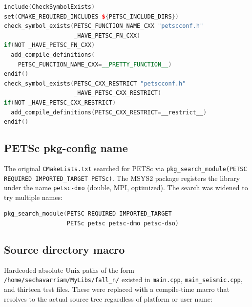 \begin{lstlisting}[language=C++, basicstyle=\ttfamily\small,
    keywordstyle=\bfseries\color{blue!70!black},
    commentstyle=\itshape\color{green!50!black},
    stringstyle=\color{red!60!black},
    frame=single, framerule=0.4pt, rulecolor=\color{gray!50},
    breaklines=true, showstringspaces=false]
include(CheckSymbolExists)
set(CMAKE_REQUIRED_INCLUDES ${PETSC_INCLUDE_DIRS})
check_symbol_exists(PETSC_FUNCTION_NAME_CXX "petscconf.h"
                    _HAVE_PETSC_FN_CXX)
if(NOT _HAVE_PETSC_FN_CXX)
  add_compile_definitions(
    PETSC_FUNCTION_NAME_CXX=__PRETTY_FUNCTION__)
endif()
check_symbol_exists(PETSC_CXX_RESTRICT "petscconf.h"
                    _HAVE_PETSC_CXX_RESTRICT)
if(NOT _HAVE_PETSC_CXX_RESTRICT)
  add_compile_definitions(PETSC_CXX_RESTRICT=__restrict__)
endif()
\end{lstlisting}

\subsection{PETSc pkg-config name}

The original \texttt{CMakeLists.txt} searched for PETSc via
\texttt{pkg\_search\_module(PETSC REQUIRED IMPORTED\_TARGET PETSc)}.  The
MSYS2 package registers the library under the name \texttt{petsc-dmo} (double,
MPI, optimized).  The search was widened to try multiple names:

\begin{lstlisting}[language=C++, basicstyle=\ttfamily\small,
    frame=single, framerule=0.4pt, rulecolor=\color{gray!50},
    breaklines=true, showstringspaces=false]
pkg_search_module(PETSC REQUIRED IMPORTED_TARGET
                  PETSc petsc petsc-dmo petsc-dso)
\end{lstlisting}

\subsection{Source directory macro}

Hardcoded absolute Unix paths of the form
\texttt{/home/sechavarriam/MyLibs/fall\_n/} existed in \texttt{main.cpp},
\texttt{main\_seismic.cpp}, and thirteen test files.  These were replaced with
a compile-time macro that resolves to the actual source tree regardless of
platform or user name:

